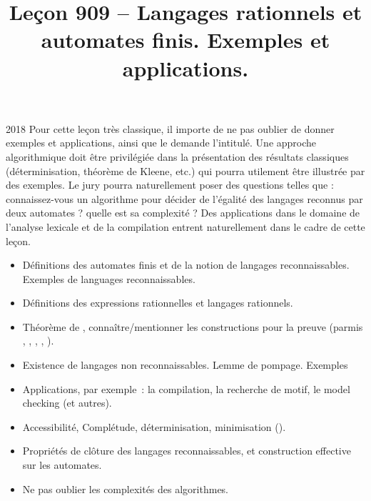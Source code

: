 \documentclass{agregfiche}
\title{Leçon 909 -- Langages rationnels et automates finis.  Exemples et applications.}
\begin{document}
\maketitle

\secrapports

\begin{rapport}{2018}
Pour cette leçon très classique, il importe de ne pas oublier de donner exemples et applications, ainsi
que le demande l’intitulé.
Une approche algorithmique doit être privilégiée dans la présentation des résultats classiques (déterminisation, théorème de
Kleene, etc.) qui pourra utilement être illustrée par des exemples. Le jury pourra naturellement poser des questions telles que : connaissez-vous un algorithme pour décider de l’égalité des langages reconnus par deux automates ? quelle est sa complexité ?
Des applications dans le domaine de l’analyse lexicale et de la compilation entrent naturellement dans
le cadre de cette leçon.
\end{rapport}

\secindispensables

\begin{itemize}
\item  Définitions des automates finis et de la notion de langages reconnaissables. Exemples de languages reconnaissables.
\item Définitions des expressions rationnelles et langages rationnels.
\item Théorème de , connaître/mentionner les constructions pour la preuve (parmis , , , , ).
\end{itemize}

\secasavoir

\begin{itemize}
	\item Existence de langages non reconnaissables. Lemme de pompage. Exemples
	\item Applications, par exemple~: la compilation, la recherche de motif, le
	model checking (et autres).
	\item Accessibilité, Complétude, déterminisation, minimisation ().
	\item Propriétés de clôture des langages reconnaissables, et construction
	effective sur les automates.
	\item Ne pas oublier les complexités des algorithmes.
\end{itemize}
\end{document}
